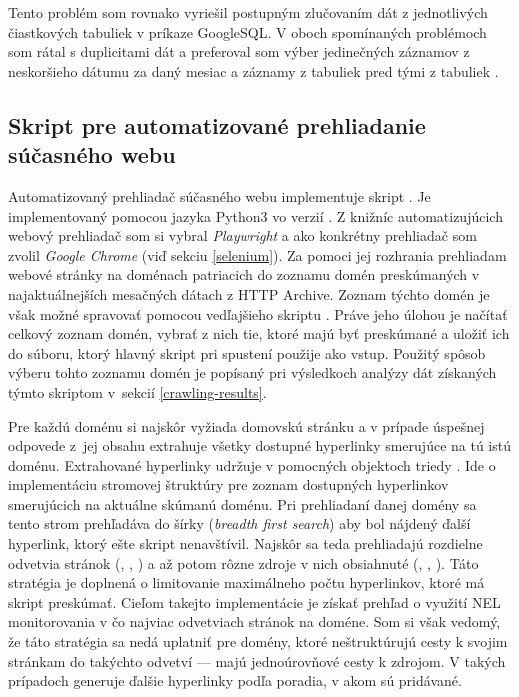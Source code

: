 Tento problém som rovnako vyriešil postupným zlučovaním dát z jednotlivých čiastkových tabuliek v príkaze GoogleSQL.
V oboch spomínaných problémoch som rátal s duplicitami dát a preferoval som výber jedinečných záznamov z neskoršieho dátumu za daný mesiac a záznamy z tabuliek  pred tými z tabuliek .


\subsection{Skript pre automatizované prehliadanie súčasného webu}
\label{crawl_and_store}

Automatizovaný prehliadač súčasného webu implementuje skript .
Je implementovaný pomocou jazyka Python3 vo verzií . 
Z knižníc automatizujúcich webový prehliadač som si vybral \textit{Playwright} a  ako konkrétny prehliadač som zvolil \textit{Google Chrome} (viď sekciu \ref{selenium}). 
Za pomoci jej rozhrania prehliadam webové stránky na doménach patriacich do zoznamu domén preskúmaných v najaktuálnejších mesačných dátach z HTTP Archive.
Zoznam týchto domén je však možné spravovať pomocou vedľajšieho skriptu .
Práve jeho úlohou je načítať celkový zoznam domén, vybrať z nich tie, ktoré majú byť preskúmané a uložiť ich do súboru, ktorý hlavný skript pri spustení použije ako vstup.
Použitý spôsob výberu tohto zoznamu domén je popísaný pri výsledkoch analýzy dát získaných týmto skriptom \mbox{v sekcií} \ref{crawling-results}. 

Pre každú doménu si najskôr vyžiada domovskú stránku a v prípade úspešnej odpovede \mbox{z jej} obsahu extrahuje všetky dostupné hyperlinky smerujúce na tú istú doménu.
Extrahované hyperlinky udržuje v pomocných objektoch triedy .
Ide o implementáciu stromovej štruktúry pre zoznam dostupných hyperlinkov smerujúcich na aktuálne skúmanú doménu. 
Pri prehliadaní danej domény sa tento strom prehľadáva do šírky (\textit{breadth first search}) aby bol nájdený ďalší hyperlink, ktorý ešte skript nenavštívil.
Najskôr sa teda prehliadajú rozdielne odvetvia stránok (, , ) a až potom rôzne zdroje v nich obsiahnuté (, , ).
Táto stratégia je doplnená o limitovanie maximálneho počtu hyperlinkov, ktoré má skript preskúmať.
Cieľom takejto implementácie je získať prehľad o využití NEL monitorovania v čo najviac odvetviach stránok na doméne.
Som si však vedomý, že táto stratégia sa nedá uplatniť pre domény, ktoré neštruktúrujú cesty k svojim stránkam do takýchto odvetví --- majú jednoúrovňové cesty k zdrojom.
V takých prípadoch generuje  ďalšie hyperlinky podľa poradia, v akom sú pridávané.

